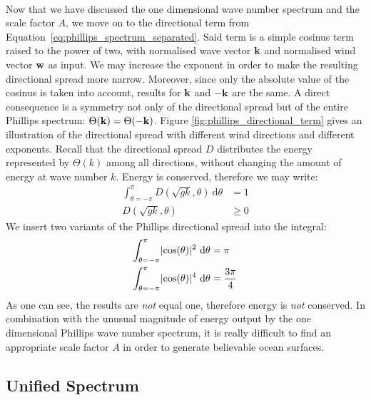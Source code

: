 %
\\

Now that we have discussed the one dimensional wave number spectrum and the 
scale factor $A$, we move on to the directional term from 
Equation~\ref{eq:phillips_spectrum_separated}. Said term is a simple cosinus 
term raised to the power of two, with normalised wave vector $\mathbf{k}$ and 
normalised wind vector $\mathbf{w}$ as input. We may increase the exponent in 
order to make the resulting directional spread more narrow. Moreover, since 
only the absolute value of the cosinus is taken into account, results for 
$\mathbf{k}$ and $-\mathbf{k}$ are the same. A direct consequence is a symmetry not 
only of the directional spread but of the entire Phillips spectrum: 
$\Theta(\mathbf{k}) = \Theta(-\mathbf{k})$. Figure 
\ref{fig:phillips_directional_term} gives an illustration of the directional 
spread with different wind directions and different exponents. Recall that the 
directional spread $D$ distributes the energy represented by $\Theta(k)$ among 
all directions, without changing the amount of energy at wave number $k$.  
Energy is conserved, therefore we may write:
\begin{subequations}
\begin{align}
\int_{\theta=-\pi}^{\pi}D(\sqrt{gk},\theta)~\mathrm{d}\theta &= 1 \\
D(\sqrt{gk},\theta) &\geq 0
\end{align}
\end{subequations}
We insert two variants of the Phillips directional spread into the integral:
\begin{subequations}
\begin{align}
\int_{\theta=-\pi}^{\pi} \lvert\cos(\theta)\rvert^2~\mathrm{d}\theta &= \pi \\
\int_{\theta=-\pi}^{\pi} \lvert\cos(\theta)\rvert^4~\mathrm{d}\theta &= \frac{3\pi}{4}
\end{align}
\end{subequations}
As one can see, the results are \emph{not} equal one, therefore energy is 
\emph{not} conserved. In combination with the unusual magnitude of energy 
output by the one dimensional Phillips wave number spectrum, it is really 
difficult to find an appropriate scale factor $A$ in order to generate 
believable ocean surfaces.
%
\subsection{Unified Spectrum}
\label{sec_unified_spectrum}

